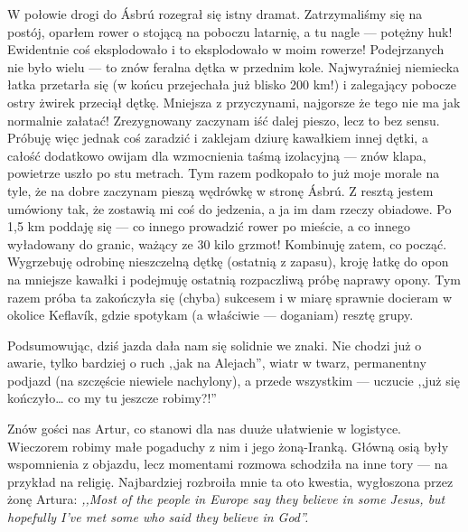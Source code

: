 W połowie drogi do Ásbrú rozegrał się istny dramat. Zatrzymaliśmy się na postój, oparłem rower o stojącą na poboczu latarnię, a tu nagle --- potężny huk! Ewidentnie coś eksplodowało i to eksplodowało w moim rowerze! Podejrzanych nie było wielu --- to znów feralna dętka w przednim kole. Najwyraźniej niemiecka łatka przetarła się (w końcu przejechała już blisko 200 km!) i zalegający pobocze ostry żwirek przeciął dętkę. Mniejsza z przyczynami, najgorsze że tego nie ma jak normalnie załatać! Zrezygnowany zaczynam iść dalej pieszo, lecz to bez sensu. Próbuję więc jednak coś zaradzić i zaklejam dziurę kawałkiem innej dętki, a całość dodatkowo owijam dla wzmocnienia taśmą izolacyjną --- znów klapa, powietrze uszło po stu metrach. Tym razem podkopało to już moje morale na tyle, że na dobre zaczynam pieszą wędrówkę w stronę Ásbrú. Z resztą jestem umówiony tak, że zostawią mi coś do jedzenia, a ja im dam rzeczy obiadowe. Po 1,5 km poddaję się --- co innego prowadzić rower po mieście, a co innego wyładowany do granic, ważący ze 30 kilo grzmot! Kombinuję zatem, co począć. Wygrzebuję odrobinę nieszczelną dętkę (ostatnią z zapasu), kroję łatkę do opon na mniejsze kawałki i podejmuję ostatnią rozpaczliwą próbę naprawy opony. Tym razem próba ta zakończyła się (chyba) sukcesem i w miarę sprawnie docieram w okolice Keflavík, gdzie spotykam (a właściwie --- doganiam) resztę grupy.

Podsumowując, dziś jazda dała nam się solidnie we znaki. Nie chodzi już o awarie, tylko bardziej o ruch ,,jak na Alejach'', wiatr w twarz, permanentny podjazd (na szczęście niewiele nachylony), a przede wszystkim --- uczucie ,,już się kończyło… co my tu jeszcze robimy?!''

Znów gości nas Artur, co stanowi dla nas duuże ułatwienie w logistyce. Wieczorem robimy małe pogaduchy z nim i jego żoną-Iranką. Główną osią były wspomnienia z objazdu, lecz momentami rozmowa schodziła na inne tory --- na przykład na religię. Najbardziej rozbroiła mnie ta oto kwestia, wygłoszona przez żonę Artura: \emph{,,Most of the people in Europe say they believe in some Jesus, but hopefully I’ve met some who said they believe in God''.}

